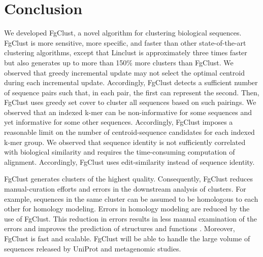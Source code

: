 \documentclass{bioinfo}
\begin{document}
%
%









\section{Conclusion}

We developed FgClust, a novel algorithm for clustering biological sequences.
FgClust is more sensitive, more specific, and faster than other state-of-the-art clustering algorithms, except that Linclust is approximately three times faster but also generates up to more than 150\% more clusters than FgClust.
We observed that greedy incremental update may not select the optimal centroid during each incremental update.
Accordingly, FgClust detects a sufficient number of sequence pairs such that, in each pair, the first can represent the second.
Then, FgClust uses greedy set cover to cluster all sequences based on such pairings.
We observed that an indexed k-mer can be non-informative for some sequences and yet informative for some other sequences.
Accordingly, FgClust imposes a reasonable limit on the number of centroid-sequence candidates for each indexed k-mer group.
We observed that sequence identity is not sufficiently correlated with biological similarity and requires the time-consuming computation of alignment.
Accordingly, FgClust uses edit-similarity instead of sequence identity.

FgClust generates clusters of the highest quality. 
Consequently, FgClust reduces manual-curation efforts and errors in the downstream analysis of clusters.
For example, sequences in the same cluster can be assumed to be homologous to each other for homology modeling.
Errors in homology modeling are reduced by the use of FgClust.
This reduction in errors results in less manual examination of the errors and improves the prediction of structures and functions \citep{nayeem2006comparative}.
Moreover, FgClust is fast and scalable.
FgClust will be able to handle the large volume of sequences released by UniProt and metagenomic studies.
\end{document}
